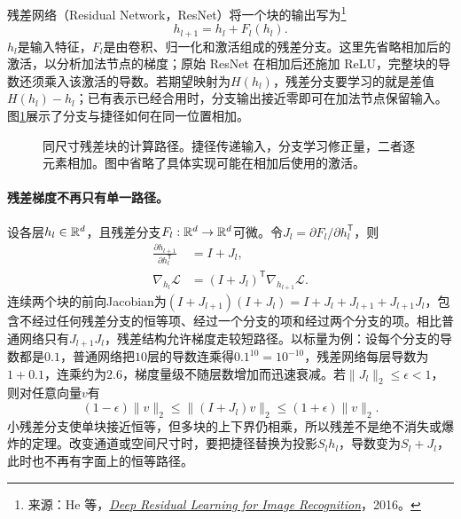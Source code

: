 残差网络（Residual Network，ResNet）将一个块的输出写为\footnote{来源：He 等，\href{https://arxiv.org/abs/1512.03385}{\textit{Deep Residual Learning for Image Recognition}}，2016。}
\begin{equation}
 h_{l+1}=h_l+F_l(h_l).
 \label{eq:vision-residual}
\end{equation}
$h_l$是输入特征，$F_l$是由卷积、归一化和激活组成的残差分支。这里先省略相加后的激活，以分析加法节点的梯度；原始 ResNet 在相加后还施加 ReLU，完整块的导数还须乘入该激活的导数。若期望映射为$H(h_l)$，残差分支要学习的就是差值$H(h_l)-h_l$；已有表示已经合用时，分支输出接近零即可在加法节点保留输入。图\ref{fig:vision-residual-block}展示了分支与捷径如何在同一位置相加。

\begin{figure}[htbp]
\centering
{}
\caption{同尺寸残差块的计算路径。捷径传递输入，分支学习修正量，二者逐元素相加。图中省略了具体实现可能在相加后使用的激活。}
\label{fig:vision-residual-block}
\end{figure}

\paragraph{残差梯度不再只有单一路径。}
设各层$h_l\in\mathbb{R}^d$，且残差分支$F_l:\mathbb{R}^d\to\mathbb{R}^d$可微。令$J_l=\partial F_l/\partial h_l^{\mathsf T}$，则
\begin{align}
 \frac{\partial h_{l+1}}{\partial h_l^{\mathsf T}}&=I+J_l,\\
 \nabla_{h_l}\mathcal L&=(I+J_l)^{\mathsf T}\nabla_{h_{l+1}}\mathcal L.
\end{align}
连续两个块的前向Jacobian为$(I+J_{l+1})(I+J_l)=I+J_l+J_{l+1}+J_{l+1}J_l$，包含不经过任何残差分支的恒等项、经过一个分支的项和经过两个分支的项。相比普通网络只有$J_{l+1}J_l$，残差结构允许梯度走较短路径。以标量为例：设每个分支的导数都是$0.1$，普通网络把$10$层的导数连乘得$0.1^{10}=10^{-10}$，残差网络每层导数为$1+0.1$，连乘约为$2.6$，梯度量级不随层数增加而迅速衰减。若$\|J_l\|_2\leq\epsilon<1$，则对任意向量$v$有
\begin{equation}
 (1-\epsilon)\|v\|_2\leq\|(I+J_l)v\|_2\leq(1+\epsilon)\|v\|_2.
\end{equation}
小残差分支使单块接近恒等，但多块的上下界仍相乘，所以残差不是绝不消失或爆炸的定理。改变通道或空间尺寸时，要把捷径替换为投影$S_lh_l$，导数变为$S_l+J_l$，此时也不再有字面上的恒等路径。


